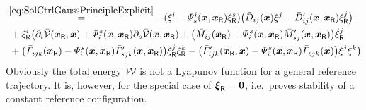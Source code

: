 \begin{align}
 &\overset{\eqref{eq:SolCtrlGaussPrincipleExplicit}}{=} -(\xi^{i} - \varPsi_{s}^{i}(\boldsymbol{x}, \boldsymbol{x}_{\mathsf{R}}) \xi^{s}_{\mathsf{R}}) \big( \bar{D}_{ij}(\boldsymbol{x}) \xi^{j} - \bar{D}_{ij}'(\boldsymbol{x}, \boldsymbol{x}_{\mathsf{R}}) \xi^{j}_{\mathsf{R}} \big)
\nonumber\\
 & \
 + \xi^{i}_{\mathsf{R}} \big( \partial_{i} \bar{\mathcal{V}}(\boldsymbol{x}_{\mathsf{R}}, \boldsymbol{x}) + \varPsi_{i}^{s}(\boldsymbol{x}, \boldsymbol{x}_{\mathsf{R}}) \partial_{s} \bar{\mathcal{V}}(\boldsymbol{x}, \boldsymbol{x}_{\mathsf{R}})
  + \big( \bar{M}_{ij}(\boldsymbol{x}_{\mathsf{R}}) - \varPsi_{i}^{s}(\boldsymbol{x}, \boldsymbol{x}_{\mathsf{R}}) \bar{M}_{sj}'(\boldsymbol{x},\boldsymbol{x}_{\mathsf{R}})          \big) \dot{\xi}^{j}_{\mathsf{R}}
\nonumber\\
 & \
 + \big( \bar{\varGamma}_{ijk}(\boldsymbol{x}_{\mathsf{R}}) - \varPsi_{i}^{s}(\boldsymbol{x}, \boldsymbol{x}_{\mathsf{R}}) \bar{\varGamma}_{sjk}'(\boldsymbol{x}, \boldsymbol{x}_{\mathsf{R}}) \big) \xi^{j}_{\mathsf{R}} \xi^{k}_{\mathsf{R}}
  - \big( \bar{\varGamma}_{ijk}'(\boldsymbol{x}_{\mathsf{R}}, \boldsymbol{x}) - \varPsi_{i}^{s}(\boldsymbol{x}, \boldsymbol{x}_{\mathsf{R}}) \bar{\varGamma}_{sjk}(\boldsymbol{x})  \big) \xi^{j} \xi^{k} \big)
\end{align}
Obviously the total energy $\bar{\mathcal{W}}$ is not a Lyapunov function for a general reference trajectory.
It is, however, for the special case of $\boldsymbol{\xi}_{\mathsf{R}} = \boldsymbol{0}$, i.e.\ proves stability of a constant reference configuration. 

